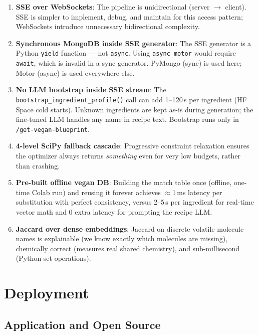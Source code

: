 \documentclass[12pt, a4paper]{article}
\begin{document}
\begin{enumerate}
  \item \textbf{SSE over WebSockets}: The pipeline is unidirectional (server $\rightarrow$ client).  SSE is simpler to implement, debug, and maintain for this access pattern; WebSockets introduce unnecessary bidirectional complexity.

  \item \textbf{Synchronous MongoDB inside SSE generator}: The SSE generator is a Python \texttt{yield} function --- not \texttt{async}.  Using \texttt{async motor} would require \texttt{await}, which is invalid in a sync generator.  PyMongo (sync) is used here; Motor (async) is used everywhere else.

  \item \textbf{No LLM bootstrap inside SSE stream}: The \texttt{bootstrap\_ingredient\_profile()} call can add 1--120\,s per ingredient (HF Space cold starts).  Unknown ingredients are kept as-is during generation; the fine-tuned LLM handles any name in recipe text.  Bootstrap runs only in \texttt{/get-vegan-blueprint}.

  \item \textbf{4-level SciPy fallback cascade}: Progressive constraint relaxation ensures the optimizer always returns \emph{something} even for very low budgets, rather than crashing.

  \item \textbf{Pre-built offline vegan DB}: Building the match table once (offline, one-time Colab run) and reusing it forever achieves $\approx$1\,ms latency per substitution with perfect consistency, versus 2--5\,s per ingredient for real-time vector math and 0 extra latency for prompting the recipe LLM.

  \item \textbf{Jaccard over dense embeddings}: Jaccard on discrete volatile molecule names is explainable (we know exactly which molecules are missing), chemically correct (measures real shared chemistry), and sub-millisecond (Python set operations).
\end{enumerate}

\section{Deployment}

\subsection{Application and Open Source}
\end{document}

